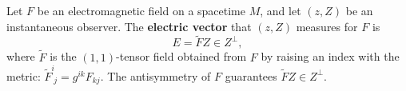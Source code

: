 Let $F$ be an electromagnetic field on a spacetime $M$, and let $(z, Z)$ be an instantaneous observer. The \textbf{electric vector} that $(z, Z)$ measures for $F$ is
$$E = \tilde{F}Z \in Z^\perp,$$
where $\tilde{F}$ is the $(1,1)$-tensor field obtained from $F$ by raising an index with the metric: $\tilde{F}^i_{\;j} = g^{ik} F_{kj}$. The antisymmetry of $F$ guarantees $\tilde{F}Z \in Z^\perp$.
